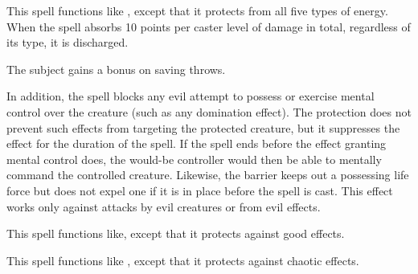 \begin{spelleffect}
  This spell functions like , except that it protects from all five types of energy. When the spell absorbs 10 points per caster level of damage in total, regardless of its type, it is discharged.
\end{spelleffect}

\spellrng{\rngclose}
\begin{spelleffect}
  The subject gains a  bonus on saving throws. \bonusscalingdescription

  In addition, the spell blocks any evil attempt to possess or exercise mental control over the creature (such as any domination effect). The protection does not prevent such effects from targeting the protected creature, but it suppresses the effect for the duration of the  spell. If the  spell ends before the effect granting mental control does, the would-be controller would then be able to mentally command the controlled creature. Likewise, the barrier keeps out a possessing life force but does not expel one if it is in place before the spell is cast. This effect works only against attacks by evil creatures or from evil effects.
\end{spelleffect}

\begin{spelleffect}
  This spell functions like, except that it protects against good effects.
\end{spelleffect}

\begin{spelleffect}
  This spell functions like , except that it protects against chaotic effects.
\end{spelleffect}

